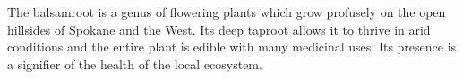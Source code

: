 \documentclass[10pt,a6paper,footinclude=false,firstfoot=false,headinclude=true,open=any,DIV=6]{scrbook} %
\begin{document}
\newpage
\thispagestyle{empty}

\begin{center}
\begin{minipage}{0.6\textwidth}

\vspace{1em}
\noindent The balsamroot is a genus of flowering plants which grow profusely on the open hillsides of Spokane and the West. Its deep taproot allows it to thrive in arid conditions and the entire plant is edible with many medicinal uses. Its presence is a signifier of the health of the local ecosystem.
\end{minipage}
\end{center}
\end{document}

